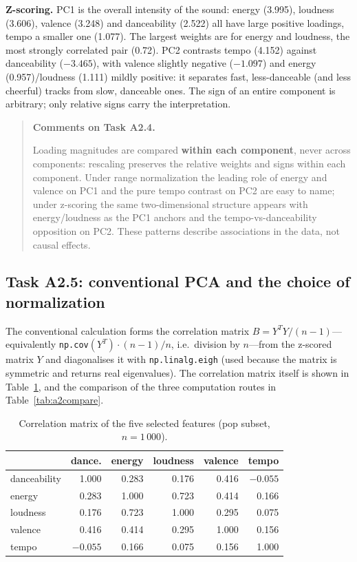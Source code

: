 \documentclass[11pt,letterpaper]{article}
\newenvironment{taskcomments}[1][Comments]{%
  \par\medskip\noindent
  \begin{quote}\small\textbf{#1.}\enspace\ignorespaces
}{%
  \end{quote}\medskip
}
\begin{document}
\textbf{Z-scoring.} PC1 is the overall intensity of the sound: energy
(3.995), loudness (3.606), valence (3.248) and danceability (2.522) all have
large positive loadings, tempo a smaller one (1.077). The largest weights are
for energy and loudness, the most strongly correlated pair (0.72). PC2
contrasts tempo (4.152) against danceability ($-3.465$), with valence
slightly negative ($-1.097$) and energy (0.957)/loudness (1.111) mildly
positive: it separates fast, less-danceable (and less cheerful) tracks from
slow, danceable ones. The sign of an entire component is arbitrary; only
relative signs carry the interpretation.

\begin{taskcomments}[Comments on Task A2.4]
Loading magnitudes are compared \textbf{within each component}, never across
components: rescaling preserves the relative weights and signs within each
component. Under range normalization the leading role of energy and valence
on PC1 and the pure tempo contrast on PC2 are easy to name; under z-scoring
the same two-dimensional structure appears with energy/loudness as the PC1
anchors and the tempo-vs-danceability opposition on PC2. These patterns
describe associations in the data, not causal effects.
\end{taskcomments}

\subsection{Task A2.5: conventional PCA and the choice of normalization}\label{sec:a2conv}

The conventional calculation forms the correlation matrix
$B = Y^TY/(n-1)$---equivalently \texttt{np.cov}$(Y^T)\cdot(n-1)/n$, i.e.\
division by $n$---from the z-scored matrix $Y$ and diagonalises it with
\texttt{np.linalg.eigh} (used because the matrix is symmetric and returns
real eigenvalues). The correlation matrix itself is shown in
Table~\ref{tab:a2corrmat}, and the comparison of the three computation routes
in Table~\ref{tab:a2compare}.

\begin{table}[H]
\centering
\caption{Correlation matrix of the five selected features (pop subset,
$n=1\,000$).}
\label{tab:a2corrmat}
\small
\begin{tabular}{lrrrrr}
\toprule
 & dance. & energy & loudness & valence & tempo \\
\midrule
danceability & 1.000 & 0.283 & 0.176 & 0.416 & $-0.055$ \\
energy       & 0.283 & 1.000 & 0.723 & 0.414 & 0.166 \\
loudness     & 0.176 & 0.723 & 1.000 & 0.295 & 0.075 \\
valence      & 0.416 & 0.414 & 0.295 & 1.000 & 0.156 \\
tempo        & $-0.055$ & 0.166 & 0.075 & 0.156 & 1.000 \\
\bottomrule
\end{tabular}
\end{table}
\end{document}
